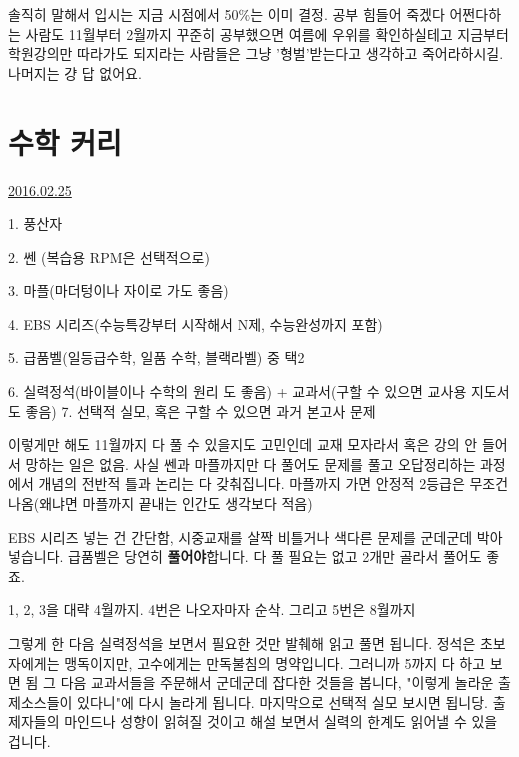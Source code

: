 솔직히 말해서 입시는 지금 시점에서 50$\%$는 이미 결정.
공부 힘들어 죽겠다 어쩐다하는 사람도 11월부터 2월까지 꾸준히 공부했으면 여름에 우위를 확인하실테고
지금부터 학원강의만 따라가도 되지라는 사람들은 그냥 '형벌'받는다고 생각하고 죽어라하시길.
나머지는 걍 답 없어요.
\vspace{5mm}










\section{수학 커리}
\href{https://www.kockoc.com/Apoc/651201}{2016.02.25}

\vspace{5mm}

\item 1. 풍산자
\item 2. 쎈 (복습용 RPM은 선택적으로)
\item 3. 마플(마더텅이나 자이로 가도 좋음)
\item 4. EBS 시리즈(수능특강부터 시작해서 N제, 수능완성까지 포함)
\item 5. 급품벨(일등급수학, 일품 수학, 블랙라벨) 중 택2
\item 6. 실력정석(바이블이나 수학의 원리 도 좋음) + 교과서(구할 수 있으면 교사용 지도서도 좋음)
7. 선택적 실모, 혹은 구할 수 있으면 과거 본고사 문제
\vspace{5mm}

이렇게만 해도 11월까지 다 풀 수 있을지도 고민인데 교재 모자라서 혹은 강의 안 들어서 망하는 일은 없음.
사실 쎈과 마플까지만 다 풀어도 문제를 풀고 오답정리하는 과정에서 개념의 전반적 틀과 논리는 다 갖춰집니다.
마플까지 가면 안정적 2등급은 무조건 나옴(왜냐면 마플까지 끝내는 인간도 생각보다 적음)
\vspace{5mm}

EBS 시리즈 넣는 건 간단함, 시중교재를 살짝 비틀거나 색다른 문제를 군데군데 박아넣습니다.
급품벨은 당연히 \textbf{풀어야}합니다. 다 풀 필요는 없고 2개만 골라서 풀어도 좋죠.
\vspace{5mm}

1, 2, 3을 대략 4월까지. 4번은 나오자마자 순삭.
그리고 5번은 8월까지
\vspace{5mm}

그렇게 한 다음 실력정석을 보면서 필요한 것만 발췌해 읽고 풀면 됩니다.
정석은 초보자에게는 맹독이지만, 고수에게는 만독불침의 명약입니다. 그러니까 5까지 다 하고 보면 됨
그 다음 교과서들을 주문해서 군데군데 잡다한 것들을 봅니다, "이렇게 놀라운 출제소스들이 있다니"에 다시 놀라게 됩니다.
마지막으로 선택적 실모 보시면 됩니당. 출제자들의 마인드나 성향이 읽혀질 것이고 해설 보면서 실력의 한계도 읽어낼 수 있을 겁니다.
\vspace{5mm}

